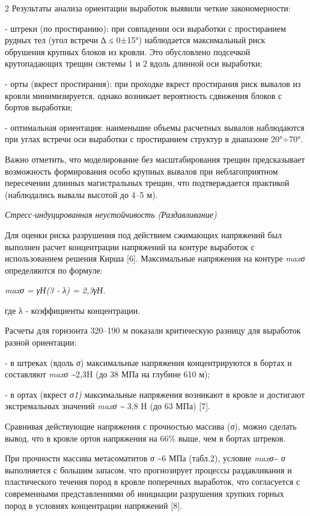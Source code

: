 \begin{multicols}{2}
Результаты анализа ориентации выработок выявили четкие закономерности:

- штреки (по простиранию): при совпадении оси выработки с простиранием
рудных тел (угол встречи \emph{∆} ≤ 0±15°) наблюдается максимальный риск
обрушения крупных блоков из кровли. Это обусловлено подсечкой
крутопадающих трещин системы 1 и 2 вдоль длинной оси выработки;

- орты (вкрест простирания): при проходке вкрест простирания риск
вывалов из кровли минимизируется, однако возникает вероятность сдвижения
блоков с бортов выработки;

- оптимальная ориентация: наименьшие объемы расчетных вывалов
наблюдаются при углах встречи оси выработки с простиранием структур в
диапазоне 20°÷70°.

Важно отметить, что моделирование без масштабирования трещин
предсказывает возможность формирования особо крупных вывалов при
неблагоприятном пересечении длинных магистральных трещин, что
подтверждается практикой (наблюдались вывалы высотой до 4--5 м).

\emph{Стресс-индуцированная неустойчивость (Раздавливание)}

Для оценки риска разрушения под действием сжимающих напряжений был
выполнен расчет концентрации напряжений на контуре выработок с
использованием решения Кирша {[}6{]}. Максимальные напряжения на контуре
\emph{maxσ} определяются по формуле:

\emph{maxσ = γН(3 - λ) = 2,3γН.}

где λ - коэффициенты концентрации.

Расчеты для горизонта 320--190 м показали критическую разницу для
выработок разной ориентации:

- в штреках (вдоль \emph{σ}) максимальные напряжения
концентрируются в бортах и составляют \emph{maxσ \textasciitilde{}}2,3H
(до 38 МПа на глубине 610 м);

- в ортах (вкрест \emph{σ1)} максимальные напряжения возникают в кровле
и достигают экстремальных значений \emph{maxσ \textasciitilde{}} 3,8 H
(до 63 МПа) {[}7{]}.

Сравнивая действующие напряжения с прочностью массива
(\emph{σ}), можно сделать вывод, что в кровле ортов
напряжения на 66\% выше, чем в бортах штреков.

При прочности массива метасоматитов \emph{σ}
\textasciitilde6 МПа (табл.2), условие \emph{maxσ}\textasciitilde{}
\emph{σ} выполняется с большим запасом, что
прогнозирует процессы раздавливания и пластического течения пород в
кровле поперечных выработок, что согласуется с современными
представлениями об инициации разрушения хрупких горных пород в условиях
концентрации напряжений {[}8{]}.
\end{multicols}

